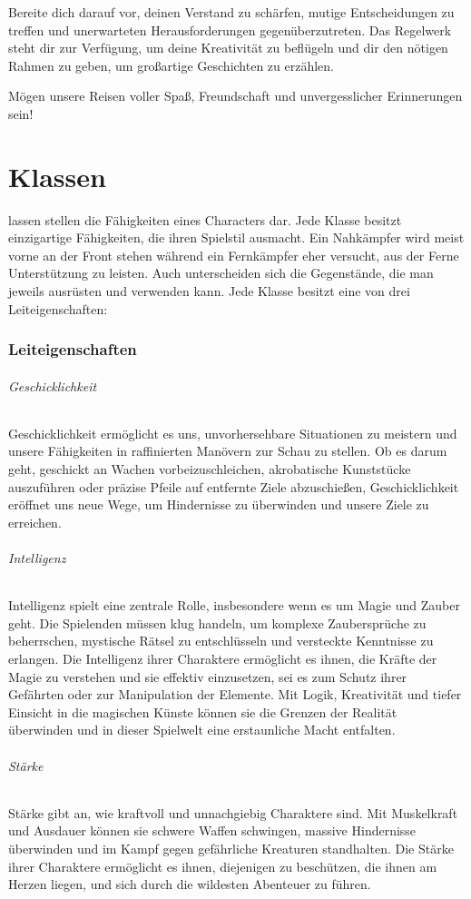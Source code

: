 \documentclass[letterpaper,twocolumn,openany,nodeprecatedcode]{dndbook}
\begin{document}
Bereite dich darauf vor, deinen Verstand zu schärfen, mutige Entscheidungen zu treffen und unerwarteten Herausforderungen gegenüberzutreten. Das Regelwerk steht dir zur Verfügung, um deine Kreativität zu beflügeln und dir den nötigen Rahmen zu geben, um großartige Geschichten zu erzählen.

Mögen unsere Reisen voller Spaß, Freundschaft und unvergesslicher Erinnerungen sein!
\chapter{Klassen}
lassen stellen die Fähigkeiten eines Characters dar. Jede Klasse besitzt einzigartige Fähigkeiten, die ihren Spielstil ausmacht. Ein Nahkämpfer wird meist vorne an der Front stehen während ein Fernkämpfer eher versucht, aus der Ferne Unterstützung zu leisten. Auch unterscheiden sich die Gegenstände, die man jeweils ausrüsten und verwenden kann. Jede Klasse besitzt eine von drei Leiteigenschaften:

\subsection{Leiteigenschaften}

\subparagraph{Geschicklichkeit}  Geschicklichkeit ermöglicht es uns, unvorhersehbare Situationen zu meistern und unsere Fähigkeiten in raffinierten Manövern zur Schau zu stellen. Ob es darum geht, geschickt an Wachen vorbeizuschleichen, akrobatische Kunststücke auszuführen oder präzise Pfeile auf entfernte Ziele abzuschießen, Geschicklichkeit eröffnet uns neue Wege, um Hindernisse zu überwinden und unsere Ziele zu erreichen.

\subparagraph{Intelligenz}  Intelligenz spielt eine zentrale Rolle, insbesondere wenn es um Magie und Zauber geht. Die Spielenden müssen klug handeln, um komplexe Zaubersprüche zu beherrschen, mystische Rätsel zu entschlüsseln und versteckte Kenntnisse zu erlangen. Die Intelligenz ihrer Charaktere ermöglicht es ihnen, die Kräfte der Magie zu verstehen und sie effektiv einzusetzen, sei es zum Schutz ihrer Gefährten oder zur Manipulation der Elemente. Mit Logik, Kreativität und tiefer Einsicht in die magischen Künste können sie die Grenzen der Realität überwinden und in dieser Spielwelt eine erstaunliche Macht entfalten. 

\subparagraph{Stärke} Stärke gibt an, wie kraftvoll und unnachgiebig Charaktere sind. Mit Muskelkraft und Ausdauer können sie schwere Waffen schwingen, massive Hindernisse überwinden und im Kampf gegen gefährliche Kreaturen standhalten. Die Stärke ihrer Charaktere ermöglicht es ihnen, diejenigen zu beschützen, die ihnen am Herzen liegen, und sich durch die wildesten Abenteuer zu führen. 
\end{document}
